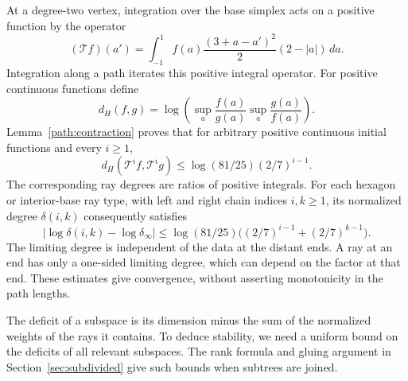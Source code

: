 At a degree-two vertex, integration over the base simplex acts on a positive
function by the operator
\[
 (\mathcal T f)(a')=
 \int_{-1}^1 f(a)\frac{(3+a-a')^2}{2}(2-|a|)\,da.
\]
Integration along a path iterates this positive integral operator.
For positive continuous functions define
\[
 d_H(f,g)=\log\left(\sup_a\frac{f(a)}{g(a)}
                            \sup_a\frac{g(a)}{f(a)}\right).
\]
Lemma~\ref{path:contraction} proves that for arbitrary positive
continuous initial functions and every $i\ge1$,
\begin{equation}\label{tree:boundary-contraction}
 d_H(\mathcal T^if,\mathcal T^ig)
 \le\log(81/25)(2/7)^{i-1}.
\end{equation}
The corresponding ray degrees are ratios of positive integrals. For
each hexagon or interior-base ray type, with left and right chain
indices $i,k\ge1$, its normalized degree $\delta(i,k)$ consequently
satisfies
\[
 |\log\delta(i,k)-\log\delta_\infty|
 \le\log(81/25)\bigl((2/7)^{i-1}+(2/7)^{k-1}\bigr).
\]
The limiting degree is independent of the data at the distant ends.
A ray at an end has only a one-sided limiting degree, which can depend
on the factor at that end. These estimates give convergence, without
asserting monotonicity in the path lengths.


The deficit of a subspace is its dimension minus the sum of the
normalized weights of the rays it contains. To deduce stability, we
need a uniform bound on the deficits of all relevant subspaces.
The rank formula and gluing argument in
Section~\ref{sec:subdivided} give such bounds when subtrees are joined.
